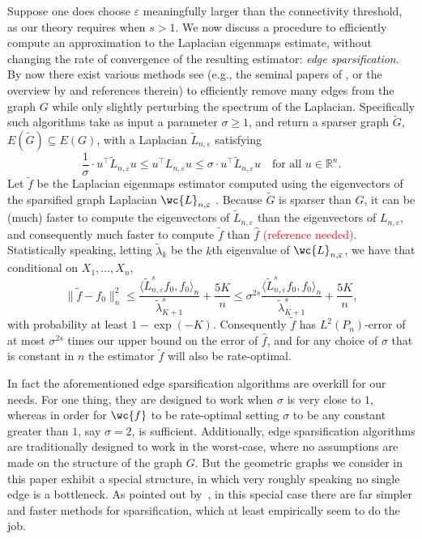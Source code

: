 \documentclass{article}
\newcommand{\Reals}{\mathbb{R}}
\newcommand{\1}{\mathbf{1}}
\newcommand{\dotp}[2]{\langle #1, #2 \rangle}
\newcommand{\wt}[1]{\widetilde{#1}}
\newcommand{\wh}[1]{\widehat{#1}}
\theoremstyle{alden}
\theoremstyle{aldenthm}
\theoremstyle{definition}
\theoremstyle{remark}
\begin{document}
Suppose one does choose $\varepsilon$ meaningfully larger than the connectivity threshold, as our theory requires when $s > 1$. We now discuss a procedure to efficiently compute an approximation to the Laplacian eigenmaps estimate, without changing the rate of convergence of the resulting estimator: \emph{edge sparsification}. By now there exist various methods see (e.g., the seminal papers of \citet{spielman2011,spielman2013,spielman2014}, or the overview by \citet{vishnoi2012} and references therein) to efficiently remove many edges from the graph $G$ while only slightly perturbing the spectrum of the Laplacian. Specifically such algorithms take as input a parameter $\sigma \geq 1$, and return a sparser graph $\wt{G}$, $E(\wt{G}) \subseteq E(G)$, with a Laplacian $\wt{L}_{n,\varepsilon}$ satisfying
\begin{equation*}
\frac{1}{\sigma} \cdot u^{\top} \wt{L}_{n,\varepsilon} u \leq u^{\top} L_{n,\varepsilon} u \leq \sigma \cdot u^{\top} \wt{L}_{n,\varepsilon}u \quad \textrm{for all $u \in \Reals^n$.}
\end{equation*}
Let $\wt{f}$ be the Laplacian eigenmaps estimator computed using the eigenvectors of the sparsified graph Laplacian $\wc{L}_{n,\varepsilon}$ . Because $\wt{G}$ is sparser than $G$, it can be (much) faster to compute the eigenvectors of $\wt{L}_{n,\varepsilon}$ than the eigenvectors of $L_{n,\varepsilon}$, and consequently much faster to compute $\wt{f}$ than $\wh{f}$ \textcolor{red}{(reference needed)}. Statistically speaking, letting $\wt{\lambda}_k$ be the $k$th eigenvalue of $\wc{L}_{n,\varepsilon}$, we have that conditional on $X_1,\ldots,X_n$,
\begin{equation*}
\|\wt{f} - f_0\|_n^2 \leq \frac{\dotp{\wt{L}_{n,\varepsilon}^s f_0}{f_0}_n}{\wt{\lambda}_{K + 1}^s} + \frac{5K}{n} \leq \sigma^{2s} \frac{\dotp{\wt{L}_{n,\varepsilon}^s f_0}{f_0}_n}{\wt{\lambda}_{K + 1}^s} + \frac{5K}{n},
\end{equation*}
with probability at least $1 - \exp(-K)$. Consequently $\wt{f}$ has $L^2(P_n)$-error of at most $\sigma^{2s}$ times our upper bound on the error of $\wh{f}$, and for any choice of $\sigma$ that is constant in $n$ the estimator $\wt{f}$ will also be rate-optimal. 

In fact the aforementioned edge sparsification algorithms are overkill for our needs. For one thing, they are designed to work when $\sigma$ is very close to $1$, whereas in order for $\wc{f}$ to be rate-optimal setting $\sigma$ to be any constant greater than $1$, say $\sigma = 2$, is sufficient. Additionally, edge sparsification algorithms are traditionally designed to work in the worst-case, where no assumptions are made on the structure of the graph $G$. But the geometric graphs we consider in this paper exhibit a special structure, in which very roughly speaking no single edge is a bottleneck. As pointed out by~\citet{sadhanala16b}, in this special case there are far simpler and faster methods for sparsification, which at least empirically seem to do the job.
\end{document}
